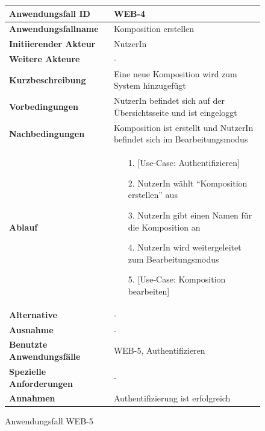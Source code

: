 \begin{figure}[h]
	\centering
	\begin{tabularx}{\textwidth}{ X | X }
		\textbf{Anwendungsfall ID} & WEB-4 \\ \hline
		\textbf{Anwendungsfallname} & Komposition erstellen \\ \hline
		\textbf{Initiierender Akteur} & NutzerIn \\ \hline
		\textbf{Weitere Akteure} & - \\ \hline
		\textbf{Kurzbeschreibung} & Eine neue Komposition wird zum System hinzugefügt \\ \hline
		\textbf{Vorbedingungen} & NutzerIn befindet sich auf der Übersichtsseite und ist eingeloggt  \\ \hline
		\textbf{Nachbedingungen} & Komposition ist erstellt und NutzerIn befindet sich im Bearbeitungsmodus \\ \hline
		\textbf{Ablauf} &
		\begin{enumerate}
			\item[1.]  [Use-Case: Authentifizieren]
			\item[2.]  NutzerIn wählt ``Komposition erstellen'' aus
			\item[3.]  NutzerIn gibt einen Namen für die Komposition an
			\item[4.]  NutzerIn wird weitergeleitet zum Bearbeitungsmodus
			\item[5.] [Use-Case: Komposition bearbeiten]
		\end{enumerate} \\ \hline
		\textbf{Alternative} & - \\ \hline
		\textbf{Ausnahme} & - \\ \hline
		\textbf{Benutzte Anwendungsfälle} & WEB-5, Authentifizieren\\ \hline
		\textbf{Spezielle Anforderungen} & - \\ \hline
		\textbf{Annahmen} & Authentifizierung ist erfolgreich
	\end{tabularx}
	\caption{Anwendungsfall WEB-5}
	\label{fig:anwendungsfall-server-tabelle-web-4}
\end{figure}

